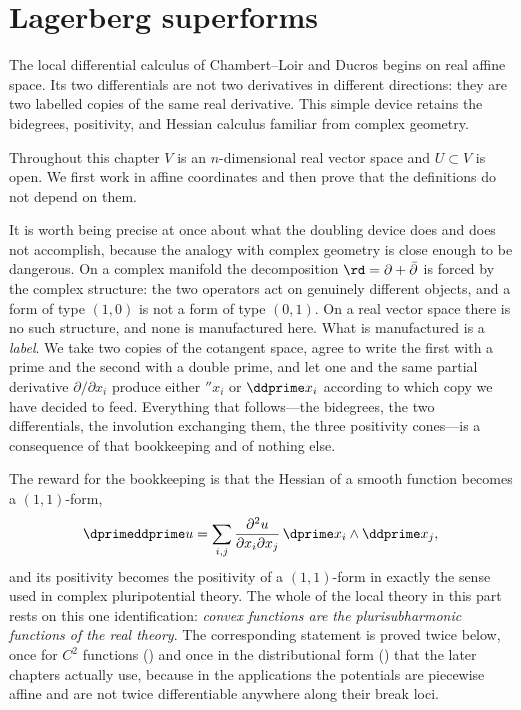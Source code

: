 \chapter{Lagerberg superforms}
\label{chap:superforms}

The local differential calculus of Chambert--Loir and Ducros begins on real
affine space. Its two differentials are not two derivatives in different
directions: they are two labelled copies of the same real derivative. This
simple device retains the bidegrees, positivity, and Hessian calculus familiar
from complex geometry.

Throughout this chapter $V$ is an $n$-dimensional real vector space and
$U\subset V$ is open. We first work in affine coordinates and then prove that
the definitions do not depend on them.

It is worth being precise at once about what the doubling device does and
does not accomplish, because the analogy with complex geometry is close
enough to be dangerous.  On a complex manifold the decomposition
$\rd=\partial+\bar\partial$ is forced by the complex structure: the two
operators act on genuinely different objects, and a form of type $(1,0)$ is
not a form of type $(0,1)$.  On a real vector space there is no such
structure, and none is manufactured here.  What is manufactured is a
\emph{label}.  We take two copies of the cotangent space, agree to write the
first with a prime and the second with a double prime, and let one and the
same partial derivative $\partial/\partial x_i$ produce either
$\dprime x_i$ or $\ddprime x_i$ according to which copy we have decided to
feed.  Everything that follows---the bidegrees, the two differentials, the
involution exchanging them, the three positivity cones---is a consequence of
that bookkeeping and of nothing else.

The reward for the bookkeeping is that the Hessian of a smooth function
becomes a $(1,1)$-form,
\[
 \dprimeddprime u
 =\sum_{i,j}\frac{\partial^2u}{\partial x_i\partial x_j}\,
   \dprime x_i\wedge\ddprime x_j ,
\]
and its positivity becomes the positivity of a $(1,1)$-form in exactly the
sense used in complex pluripotential theory.  The whole of the local theory
in this part rests on this one identification: \emph{convex functions are the
plurisubharmonic functions of the real theory}.  The corresponding statement
is proved twice below, once for $C^2$ functions
() and once in the distributional form
() that the later chapters actually
use, because in the applications the potentials are piecewise affine and are
not twice differentiable anywhere along their break loci.


